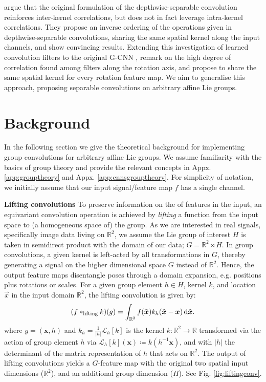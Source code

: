 \documentclass[nohyperref]{article}
\theoremstyle{plain}
\theoremstyle{definition}
\theoremstyle{remark}
\begin{document}
\citet{haase2020rethinking} argue that the original formulation of the depthwise-separable convolution reinforces inter-kernel correlations, but does not in fact leverage intra-kernel correlations. They propose an inverse ordering of the operations given in depthwise-separable convolutions, sharing the same spatial kernel along the input channels, and show convincing results. Extending this investigation of learned convolution filters to the original G-CNN \citep{cohen2016group}, \citet{lengyel2021exploiting} remark on the high degree of correlation found among filters along the rotation axis, and propose to share the same spatial kernel for every rotation feature map. We aim to generalise this approach, proposing separable convolutions on arbitrary affine Lie groups.
\section{Background}
In the following section we give the theoretical background for implementing group convolutions for arbitrary affine Lie groups. We assume familiarity with the basics of group theory and provide the relevant concepts in Appx. \ref{app:grouptheory} and Appx. \ref{app:cnnsgrouptheory}. For simplicity of notation, we initially assume that our input signal/feature map $f$ has a single channel.

\textbf{Lifting convolutions} To preserve information on the  of features in the input, an equivariant convolution operation is achieved by \textit{lifting} a function from the input space to (a homogeneous space of) the group. As we are interested in real signals, specifically image data living on $\mathbb{R}^2$, we assume the Lie group of interest $H$ is taken in semidirect product with the domain of our data; $G {=} \mathbb{R}^2 \rtimes H$. In group convolutions, a given kernel is left-acted by all transformations in $G$, thereby generating a signal on the higher dimensional space $G$ instead of $\mathbb{R}^2$. Hence, the output feature maps disentangle poses through a domain expansion, e.g. positions plus rotations or scales. For a given group element $h \in H$, kernel $k$, and location $\vec{x}$ in the input domain $\mathbb{R}^2$, the lifting convolution is given by:
\begin{equation}
\label{eq:liftingconv}
    (f *_{\text{lifting}} k) (g) = 
    \int_{\mathbb{R}^2} f(\tilde{\boldsymbol{x}})k_h(\tilde{\boldsymbol{x}} - \boldsymbol{x}) \,{\rm d}\tilde{\boldsymbol{x}}.
\end{equation}
where $g{=}(\boldsymbol{x},h)$ and $k_h{=}\frac{1}{| h|}\mathcal{L}_{h}[k]$ is the kernel $k:\mathbb{R}^2 \rightarrow \mathbb{R}$ transformed via the action of group element $h$ via $\mathcal{L}_h [k](\boldsymbol{x})\coloneqq k(h^{-1} \boldsymbol{x})$, and with $|h|$ the determinant of the matrix representation of $h$ that acts on $\mathbb{R}^2$. The output of lifting convolutions yields a $G$-feature map with the original two spatial input dimensions ($\mathbb{R}^2$), and an additional group dimension ($H$). See Fig. \ref{fig:liftingconv}.
\end{document}
